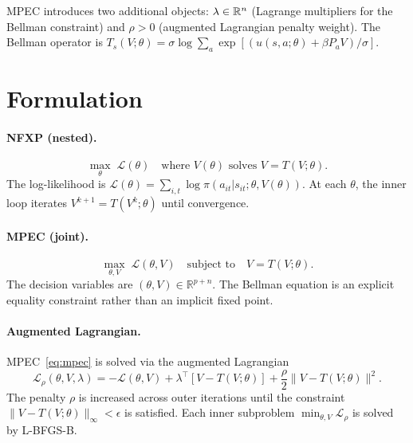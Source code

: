 \documentclass[11pt]{article}
\begin{document}
\commonnotation

\noindent MPEC introduces two additional objects: $\lambda \in \mathbb{R}^n$ (Lagrange multipliers for the Bellman constraint) and $\rho > 0$ (augmented Lagrangian penalty weight).
The Bellman operator is $T_s(V;\theta) = \sigma \log \sum_a \exp[(u(s,a;\theta) + \beta P_a V)/\sigma]$.
\FloatBarrier

\section{Formulation}

\paragraph{NFXP (nested).}
\begin{equation}
\label{eq:nfxp}
\max_\theta \; \mathcal{L}(\theta) \quad \text{where } V(\theta) \text{ solves } V = T(V;\theta).
\end{equation}
The log-likelihood is $\mathcal{L}(\theta) = \sum_{i,t} \log \pi(a_{it} | s_{it}; \theta, V(\theta))$.
At each $\theta$, the inner loop iterates $V^{k+1} = T(V^k;\theta)$ until convergence.

\paragraph{MPEC (joint).}
\begin{equation}
\label{eq:mpec}
\max_{\theta, V} \; \mathcal{L}(\theta, V) \quad \text{subject to} \quad V = T(V;\theta).
\end{equation}
The decision variables are $(\theta, V) \in \mathbb{R}^{p+n}$.
The Bellman equation is an explicit equality constraint rather than an implicit fixed point.

\paragraph{Augmented Lagrangian.}
MPEC~\eqref{eq:mpec} is solved via the augmented Lagrangian
\begin{equation}
\label{eq:al}
\mathcal{L}_\rho(\theta, V, \lambda) = -\mathcal{L}(\theta, V) + \lambda^\top [V - T(V;\theta)] + \frac{\rho}{2} \|V - T(V;\theta)\|^2.
\end{equation}
The penalty $\rho$ is increased across outer iterations until the constraint $\|V - T(V;\theta)\|_\infty < \epsilon$ is satisfied.
Each inner subproblem $\min_{\theta,V} \mathcal{L}_\rho$ is solved by L-BFGS-B.
\end{document}
